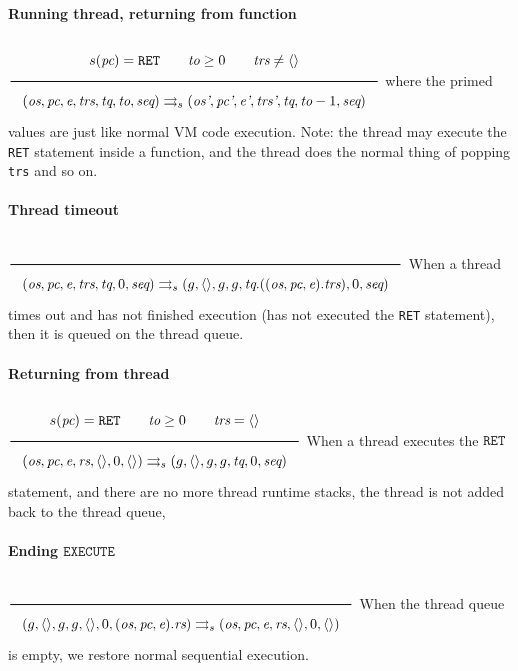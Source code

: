 \documentclass[11pt]{article}
\newcommand{\Rule}[2]{\genfrac{}{}{0.7pt}{}{{\setlength{\fboxrule}{0pt}\setlength{\fboxsep}{3mm}\fbox{$#1$}}}{{\setlength{\fboxrule}{0pt}\setlength{\fboxsep}{3mm}\fbox{$#2$}}}}
\newcommand{\transition}{\rightrightarrows_s}
\begin{document}
\paragraph{Running thread, returning from function}
\label{sec:orgcacd3c5}
\(\\\Rule{s(\textit{pc}) = \texttt{RET} \qquad \textit{to} \ge 0 \qquad \textit{trs} \neq \langle \rangle}{(\textit{os}, \textit{pc}, \textit{e}, \textit{trs}, \textit{tq}, \textit{to}, \textit{seq}) \transition (\textit{os'}, \textit{pc'}, \textit{e'}, \textit{trs'}, \textit{tq}, \textit{to}-1, \textit{seq})}\\\)
where the primed values are just like normal VM code execution. Note: the thread may execute the \texttt{RET} statement inside a function, and the thread does the normal thing of popping \texttt{trs} and so on.

\paragraph{Thread timeout}
\label{sec:org2a45ce5}
\(\\\Rule{}{(\textit{os}, \textit{pc}, \textit{e}, \textit{trs}, \textit{tq}, 0, \textit{seq}) \transition (g, \langle \rangle, g, g, \textit{tq}.((\textit{os}, \textit{pc}, \textit{e}).\textit{trs}), 0, \textit{seq})}\\\)
When a thread times out and has not finished execution (has not executed the \texttt{RET} statement), then it is queued on the thread queue.

\paragraph{Returning from thread}
\label{sec:org469c5b0}
\(\\\Rule{s(\textit{pc}) = \texttt{RET} \qquad \textit{to} \ge 0 \qquad \textit{trs} = \langle \rangle}{(\textit{os}, \textit{pc}, \textit{e}, \textit{rs}, \langle \rangle, 0, \langle \rangle) \transition (g, \langle \rangle, g, g, \textit{tq}, 0, \textit{seq})}\\\)
When a thread executes the \(\texttt{RET}\) statement, and there are no more thread runtime stacks, the thread is not added back to the thread queue,

\paragraph{Ending \(\texttt{EXECUTE}\)}
\label{sec:org69772e4}
\(\\\Rule{}{(g, \langle \rangle, g, g, \langle \rangle, 0, (\textit{os}, \textit{pc}, \textit{e}).\textit{rs}) \transition (\textit{os}, \textit{pc}, \textit{e}, \textit{rs}, \langle \rangle, 0, \langle \rangle)}\\\)
When the thread queue is empty, we restore normal sequential execution.
\end{document}
